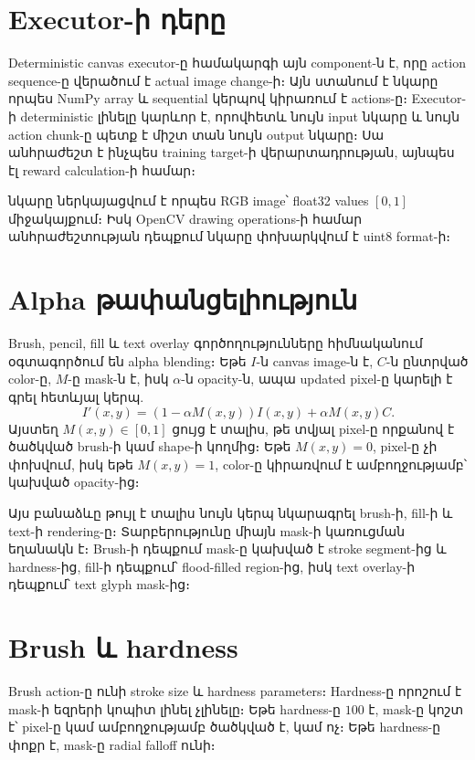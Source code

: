 \documentclass[12pt,a4paper]{report}
\begin{document}
\section{Executor-ի դերը}

Deterministic canvas executor-ը համակարգի այն component-ն է, որը action sequence-ը վերածում է actual image change-ի։ Այն ստանում է նկարը որպես NumPy array և sequential կերպով կիրառում է actions-ը։ Executor-ի deterministic լինելը կարևոր է, որովհետև նույն input նկարը և նույն action chunk-ը պետք է միշտ տան նույն output նկարը։ Սա անհրաժեշտ է ինչպես training target-ի վերարտադրության, այնպես էլ reward calculation-ի համար։

նկարը ներկայացվում է որպես RGB image՝ float32 values $[0,1]$ միջակայքում։ Իսկ OpenCV drawing operations-ի համար անհրաժեշտության դեպքում նկարը փոխարկվում է uint8 format-ի։

\section{Alpha թափանցելիություն}

Brush, pencil, fill և text overlay գործողությունները հիմնականում օգտագործում են alpha blending։ Եթե $I$-ն canvas image-ն է, $C$-ն ընտրված color-ը, $M$-ը mask-ն է, իսկ $\alpha$-ն opacity-ն, ապա updated pixel-ը կարելի է գրել հետևյալ կերպ.
\begin{equation}
    I'(x,y) = (1 - \alpha M(x,y))I(x,y) + \alpha M(x,y)C.
\end{equation}
Այստեղ $M(x,y)\in[0,1]$ ցույց է տալիս, թե տվյալ pixel-ը որքանով է ծածկված brush-ի կամ shape-ի կողմից։ Եթե $M(x,y)=0$, pixel-ը չի փոխվում, իսկ եթե $M(x,y)=1$, color-ը կիրառվում է ամբողջությամբ՝ կախված opacity-ից։

Այս բանաձևը թույլ է տալիս նույն կերպ նկարագրել brush-ի, fill-ի և text-ի rendering-ը։ Տարբերությունը միայն mask-ի կառուցման եղանակն է։ Brush-ի դեպքում mask-ը կախված է stroke segment-ից և hardness-ից, fill-ի դեպքում՝ flood-filled region-ից, իսկ text overlay-ի դեպքում՝ text glyph mask-ից։

\section{Brush և hardness}

Brush action-ը ունի stroke size և hardness parameters։ Hardness-ը որոշում է mask-ի եզրերի կոպիտ լինել չլինելը։ Եթե hardness-ը $100$ է, mask-ը կոշտ է՝ pixel-ը կամ ամբողջությամբ ծածկված է, կամ ոչ։ Եթե hardness-ը փոքր է, mask-ը radial falloff ունի։
\end{document}

